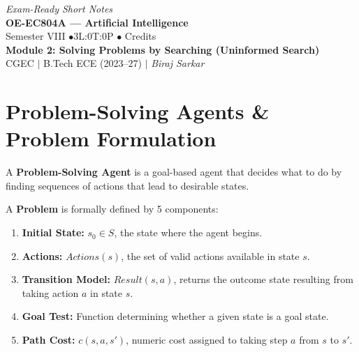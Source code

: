 \documentclass[12pt,a4paper]{article}
\begin{document}
\begin{center}
  \hfill \textit{Exam-Ready Short Notes} \\
  \vspace{6pt}
  {\LARGE\bfseries\color{myred} OE-EC804A --- Artificial Intelligence}\\[5pt]
  {\normalsize\color{mydark} Semester VIII \quad$\bullet$\quad 3L:0T:0P \quad$\bullet$ Credits}\\[3pt]
  {\normalsize\color{myteal}\textbf{Module 2: Solving Problems by Searching (Uninformed Search)}}\\[3pt]
  {\small\color{mydark} CGEC \;$|$\; B.Tech ECE (2023--27) \;$|$\; \textit{Biraj Sarkar}}
\end{center}
\vspace{2pt}
\noindent{\color{myred}\rule{\linewidth}{1.5pt}}
\vspace{2pt}

\hypersetup{linkcolor=mydark}
\tableofcontents
\hypersetup{linkcolor=myteal}
\newpage

\section{Problem-Solving Agents \& Problem Formulation}

A \textbf{Problem-Solving Agent} is a goal-based agent that decides what to do by finding sequences of actions that lead to desirable states.

\begin{tcolorbox}[defbox, title={Definition of a Problem}]
  A \textbf{Problem} is formally defined by 5 components:
  \begin{enumerate}[leftmargin=*, noitemsep]
    \item \textbf{Initial State:} $s_0 \in S$, the state where the agent begins.
    \item \textbf{Actions:} $Actions(s)$, the set of valid actions available in state $s$.
    \item \textbf{Transition Model:} $Result(s, a)$, returns the outcome state resulting from taking action $a$ in state $s$.
    \item \textbf{Goal Test:} Function determining whether a given state is a goal state.
    \item \textbf{Path Cost:} $c(s, a, s')$, numeric cost assigned to taking step $a$ from $s$ to $s'$.
  \end{enumerate}
\end{tcolorbox}
\end{document}
